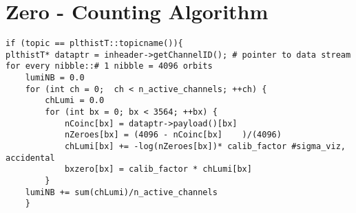 \section{ Zero - Counting Algorithm}

\begin{verbatim}
if (topic == plthistT::topicname()){
plthistT* dataptr = inheader->getChannelID(); # pointer to data stream
for every nibble::# 1 nibble = 4096 orbits
    lumiNB = 0.0
    for (int ch = 0;  ch < n_active_channels; ++ch) {
        chLumi = 0.0
        for (int bx = 0; bx < 3564; ++bx) {
            nCoinc[bx] = dataptr->payload()[bx]
            nZeroes[bx] = (4096 - nCoinc[bx]	)/(4096)
            chLumi[bx] += -log(nZeroes[bx])* calib_factor #sigma_viz, accidental
            bxzero[bx] = calib_factor * chLumi[bx]
        }
    lumiNB += sum(chLumi)/n_active_channels
    }
\end{verbatim}




